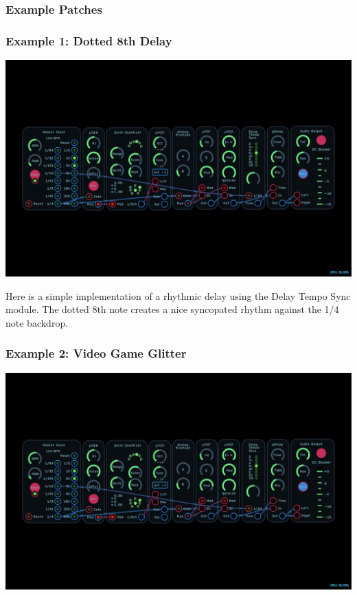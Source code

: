 \documentclass[11pt]{book}
\begin{document}
\begin{multicols*}{2}
\subsubsection*{Example Patches}

\subsubsection*{Example 1: Dotted 8th Delay}

\begin{center}
\includegraphics[width=0.95\linewidth]{delay-tempo-sync-fig3.png}
\end{center}

Here is a simple implementation of a rhythmic delay using the Delay Tempo Sync module. The dotted 8th note creates a nice syncopated rhythm against the 1/4 note backdrop.

\subsubsection*{Example 2: Video Game Glitter}

\begin{center}
\includegraphics[width=0.95\linewidth]{delay-tempo-sync-fig3.png}
\end{center}


\end{multicols*}
\end{document}

